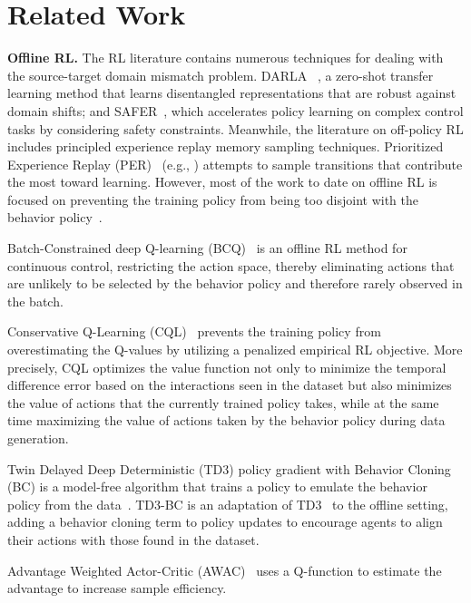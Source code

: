 \section{Related Work}
\label{sec:related_work}
\noindent\textbf{Offline RL.}
The RL literature contains numerous techniques for dealing with the source-target domain mismatch problem. DARLA ~\citep{higgins2017darla}, a zero-shot transfer learning method that learns disentangled representations that are robust against domain shifts; and SAFER~\citep{slack2022safer}, which accelerates policy learning on complex control tasks by considering safety constraints. Meanwhile, the literature on off-policy RL includes principled experience replay memory sampling techniques. Prioritized Experience Replay (PER)~\citep{schaul2015prioritized} (e.g., \citep{hou2017novel,horgan2018distributed,kang2021deep}) attempts to sample transitions that contribute the most toward learning. However, most of the work to date on offline RL is focused on preventing the training policy from being too disjoint with the behavior policy~\citep{fujimoto2019off,kumar2020conservative,kidambi2020morel}. 

Batch-Constrained deep Q-learning (BCQ)~\citep{fujimoto2019off} is an offline RL method for continuous control, restricting the action space, thereby eliminating actions that are unlikely to be selected by the behavior policy and therefore rarely observed in the batch. 

Conservative Q-Learning (CQL)~\citep{kumar2020conservative} prevents the training policy from overestimating the Q-values by utilizing a penalized empirical RL objective. More precisely, CQL optimizes the value function not only to minimize the temporal difference error based on the interactions seen in the dataset but also minimizes the value of actions that the currently trained policy takes, while at the same time maximizing the value of actions taken by the behavior policy during data generation. 


Twin Delayed Deep Deterministic (TD3) policy gradient with Behavior Cloning (BC) is a model-free algorithm that trains a policy to emulate the behavior policy from the data~\citep{fujimoto2021minimalist}. TD3-BC is an adaptation of TD3~\citep{fujimoto2018addressing} to the offline setting, adding a behavior cloning term to policy updates to encourage agents to align their actions with those found in the dataset. 

Advantage Weighted Actor-Critic (AWAC)~\citep{nair2020awac} uses a Q-function to estimate the advantage to increase sample efficiency. 



